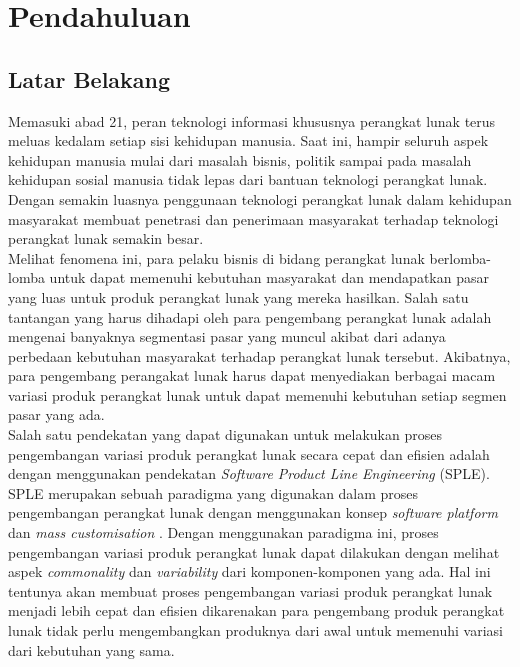 \chapter{Pendahuluan}

\section{Latar Belakang}
Memasuki abad 21, peran teknologi informasi khususnya perangkat lunak terus meluas kedalam setiap sisi kehidupan manusia. Saat ini, hampir seluruh aspek kehidupan manusia mulai dari masalah bisnis, politik sampai pada masalah kehidupan sosial manusia tidak lepas dari bantuan teknologi perangkat lunak. Dengan semakin luasnya penggunaan teknologi perangkat lunak dalam kehidupan masyarakat membuat penetrasi dan penerimaan masyarakat terhadap teknologi perangkat lunak semakin besar.\\

Melihat fenomena ini, para pelaku bisnis di bidang perangkat lunak berlomba-lomba untuk dapat memenuhi kebutuhan masyarakat dan mendapatkan pasar yang luas untuk produk perangkat lunak yang mereka hasilkan. Salah satu tantangan yang harus dihadapi oleh para pengembang perangkat lunak adalah mengenai banyaknya segmentasi pasar yang muncul akibat dari adanya perbedaan kebutuhan masyarakat terhadap perangkat lunak tersebut. Akibatnya, para pengembang perangakat lunak harus dapat menyediakan berbagai macam variasi produk perangkat lunak untuk dapat memenuhi kebutuhan setiap segmen pasar yang ada.\\

Salah satu pendekatan yang dapat digunakan untuk melakukan proses pengembangan variasi produk perangkat lunak secara cepat dan efisien adalah dengan menggunakan pendekatan \textit{Software Product Line Engineering} (SPLE). SPLE merupakan sebuah paradigma yang digunakan dalam proses pengembangan perangkat lunak dengan menggunakan konsep \textit{software platform} dan \textit{mass customisation} \citep[p.~14]{pohl2005software}. Dengan menggunakan paradigma ini, proses pengembangan variasi produk perangkat lunak dapat dilakukan dengan melihat aspek \textit{commonality} dan \textit{variability} dari komponen-komponen yang ada. Hal ini tentunya akan membuat proses pengembangan variasi produk perangkat lunak menjadi lebih cepat dan efisien dikarenakan para pengembang produk perangkat lunak tidak perlu mengembangkan produknya dari awal untuk memenuhi variasi dari kebutuhan yang sama. \\

